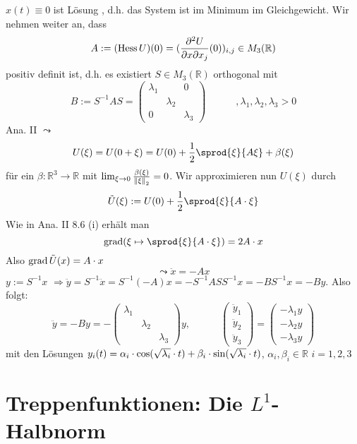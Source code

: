 $x(t)\equiv 0$ ist Lösung , d.h. das System ist im Minimum im Gleichgewicht. Wir nehmen weiter an, dass 
\[
	A := ( \operatorname{Hess} U)(0) = ( \frac{\partial^2 U}{\partial x \partial x_j} (0))_{i,j} \in M_3(\mathbb{R})  
\]
positiv definit ist, d.h. es existiert $S \in M_3(\mathds{R})$ orthogonal mit 
\[
	B := S ^{-1} A S = \begin{pmatrix}
		\lambda_1 & & 0 \\
		& \lambda_2 & \\
		0 & & \lambda_3
	\end{pmatrix} \qquad \quad , \lambda_1, \lambda_2, \lambda_3 >0
\]
Ana. II $\leadsto$
\[
	U(\xi)= U(0 + \xi) = U(0) + \frac{1}{2} \sprod{\xi}{A \xi} + \beta(\xi)  
\]
für ein $\beta : \mathds{R}^3 \to \mathds{R}$ mit $\lim_{ \xi \to 0} \frac{\beta(\xi)}{\norm[2]{\xi} } = 0 $. Wir approximieren nun $U(\xi)$ durch 
\[
	\tilde U (\xi) := U(0)+ \frac{1}{2} \sprod{\xi}{A \cdot \xi} 
\]
Wie in Ana. II 8.6 (i) erhält man 
\[
	\grad\enbrace{\xi \mapsto \sprod{\xi}{A \cdot \xi} }  = 2 A \cdot x
\]
Also $\operatorname{grad} \tilde U (x) = A \cdot x$
\[
	\leadsto \ddot x = - A x
\]
$y := S ^{-1} x$ $\Rightarrow \ddot y = S ^{-1} \ddot x  = S ^{-1} (-A)x =- S ^{-1} A S S ^{-1} x = - B S ^{-1}  x = -B y$. Also folgt:
\[
	\ddot y = - B y = - \begin{pmatrix}
		\lambda_1 & & \\
		& \lambda_2 & \\
		& & \lambda_3
	\end{pmatrix}y, \qquad \quad \begin{pmatrix}
		\ddot y_1 \\
		\ddot y_2 \\
		\ddot y_3
	\end{pmatrix} = \begin{pmatrix}
		-\lambda_1 y \\
		-\lambda_2 y \\
		- \lambda_3 y
	\end{pmatrix}
\]
mit den Lösungen $y_i(t) = \alpha_i \cdot  \cos (\sqrt{\lambda_i}\cdot t  ) + \beta_i \cdot \sin (\sqrt{\lambda_i} \cdot t  ) $, $\alpha_i, \beta_i \in \mathds{R}$
$i=1,2,3$
\newpage

\section{Treppenfunktionen: Die $L^1$-Halbnorm} %
\label{sec:3}


